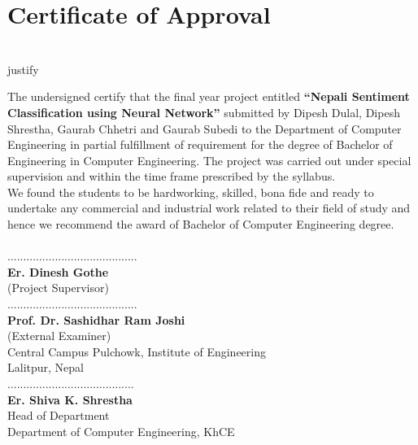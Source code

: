 
			\begingroup
				\let\clearpage\relax
				\chapter*{Certificate of Approval}
			\endgroup
			\\justify
			
		   		The undersigned certify that the final year project entitled \textbf{“Nepali Sentiment
Classification using Neural Network”} submitted by Dipesh Dulal, Dipesh Shrestha,
Gaurab Chhetri and Gaurab Subedi to the Department of Computer Engineering in partial fulfillment of requirement for
the degree of Bachelor of Engineering in Computer Engineering. The project was
carried out under special supervision and within the time frame prescribed by the
syllabus.
\\
We found the students to be hardworking, skilled, bona fide and ready to undertake any
commercial and industrial work related to their field of study and hence we recommend
the award of Bachelor of Computer Engineering degree.\\
\vspace{1.5cm}
\\
.........................................\\
\textbf{Er. Dinesh Gothe}\\
(Project Supervisor)\\

\vspace{1.5cm}
.........................................\\
\textbf{Prof. Dr. Sashidhar Ram Joshi}\\
(External Examiner)\\
Central Campus Pulchowk, Institute of Engineering\\
Lalitpur, Nepal\\

\vspace{1.5cm}
........................................\\
\textbf{Er. Shiva K. Shrestha}\\
Head of Department\\
Department of Computer Engineering, KhCE\\
        \break



		\large
